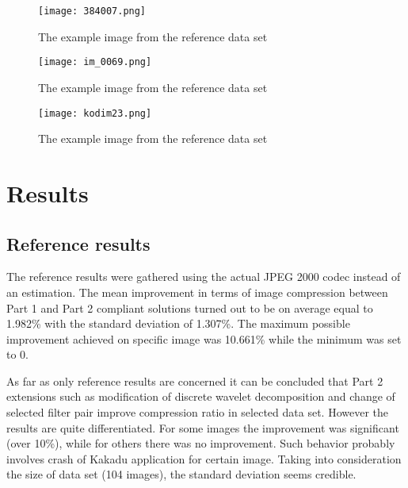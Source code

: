 \begin{figure}[!htb]
    \centering
    \texttt{[image: 384007.png]}
    \caption{The example image from the reference data set \cite{ref_images}}
    \label{fig:example_1}
\end{figure}

\begin{figure}[!htb]
    \centering
    \texttt{[image: im\_0069.png]}
    \caption{The example image from the reference data set \cite{ref_images}}
    \label{fig:example_2}
\end{figure}

\begin{figure}[!htb]
    \centering
    \texttt{[image: kodim23.png]}
    \caption{The example image from the reference data set \cite{ref_images}}
    \label{fig:example_3}
\end{figure}


\section{Results} \label{sec:results}

\subsection{Reference results} \label{sec:ref_results}

The reference results were gathered using the actual JPEG 2000 codec instead of an estimation.
The mean improvement in terms of image compression between Part 1 and Part 2 compliant solutions
turned out to be on average equal to 1.982\% with the standard deviation of 1.307\%. The maximum
possible improvement achieved on specific image was 10.661\% while the minimum was set to 0.

As far as only reference results are concerned it can be concluded that Part 2 extensions such as modification
of discrete wavelet decomposition and change of selected filter pair improve compression ratio
in selected data set. However the results are quite differentiated. For some images the improvement
was significant (over 10\%), while for others there was no improvement. Such behavior probably
involves crash of Kakadu application for certain image. Taking into consideration the size of
data set (104 images), the standard deviation seems credible.


